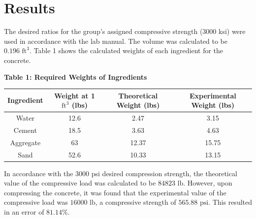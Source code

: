 \documentclass{article}
\begin{document}
    \section{Results}
    \noindent The desired ratios for the group's assigned compressive strength (3000 ksi) were used in accordance with the lab manual. The volume was calculated to be \(\boxed{0.196\text{ ft}^3}\). Table 1 shows the calculated weights of each ingredient for the concrete.
    \begin{center}
    {\large{\bf Table 1: Required Weights of Ingredients\\}}
    \vspace{3mm}
    \begin{tabular}{|cccc|}
        \hline
        \textbf{Ingredient} & \textbf{Weight at 1 \(\text{ft}^3\) (lbs)} & \textbf{Theoretical Weight (lbs)} & \textbf{Experimental Weight (lbs)}  \\\hline
        Water      & 12.6   & 2.47                               & 3.15                                 \\
        Cement     & 18.5   & 3.63                               & 4.63                                 \\
        Aggregate  & 63     & 12.37                              & 15.75                                \\
        Sand       & 52.6   & 10.33                              & 13.15                                \\\hline
    \end{tabular}
    \vspace{5mm}
    \end{center}
    In accordance with the 3000 psi desired compression strength, the theoretical value of the compressive load was calculated to be \(\boxed{\text{84823 lb}}\). However, upon compressing the concrete, it was found that the experimental value of the compressive load was \(\boxed{\text{16000 lb}}\), a compressive strength of \(\boxed{\text{565.88 psi}}\). This resulted in an error of \(\boxed{81.14\%}\).
    \newpage
\end{document}
